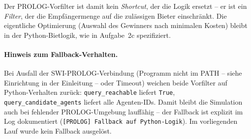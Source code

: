 Der \acs{PROLOG}-Vorfilter ist damit kein \textit{Shortcut}, der die Logik ersetzt -- er ist ein \textit{Filter}, der die Empfängermenge auf die zulässigen Bieter einschränkt. Die eigentliche Optimierung (Auswahl des Gewinners nach minimalen Kosten) bleibt in der Python-Bietlogik, wie in Aufgabe~2c spezifiziert.

\paragraph{Hinweis zum Fallback-Verhalten.}
Bei Ausfall der \acs{SWI}-\acs{PROLOG}-Verbindung (Programm nicht im \acs{PATH} -- siehe Einrichtung in der Einleitung -- oder Timeout) weichen beide Vorfilter auf Python-Verhalten zurück: \texttt{query\_reachable} liefert \texttt{True}, \texttt{query\_candidate\_agents} liefert alle Agenten-IDs. Damit bleibt die Simulation auch bei fehlender \acs{PROLOG}-Umgebung lauffähig -- der Fallback ist explizit im Log dokumentiert (\texttt{[\acs{PROLOG}] Fallback auf Python-Logik}). Im vorliegenden Lauf wurde kein Fallback ausgelöst.

